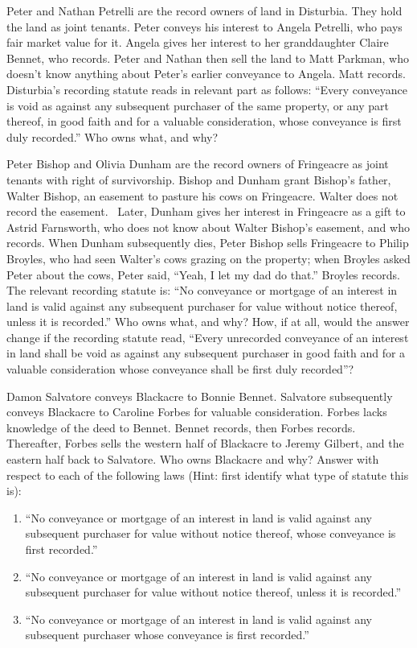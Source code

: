 \item Peter and Nathan Petrelli are the record owners of land in Disturbia. They
hold the land as joint tenants. Peter conveys his interest to Angela Petrelli,
who pays fair market value for it. Angela gives her interest to her
granddaughter Claire Bennet, who records. Peter and Nathan then sell the land
to Matt Parkman, who doesn't know anything about Peter's earlier conveyance to
Angela. Matt records. Disturbia's recording statute reads in relevant part as
follows: ``Every conveyance is void as against any subsequent purchaser of the
same property, or any part thereof, in good faith and for a valuable
consideration, whose conveyance is first duly recorded.'' Who owns what, and
why?


\item Peter Bishop and Olivia Dunham are the record owners of Fringeacre as
joint tenants with right of survivorship. Bishop and Dunham grant Bishop's
father, Walter Bishop, an easement to pasture his cows on Fringeacre. Walter
does not record the easement. ~Later, Dunham gives her interest in Fringeacre
as a gift to Astrid Farnsworth, who does not know about Walter Bishop's
easement, and who records. When Dunham subsequently dies, Peter Bishop sells
Fringeacre to Philip Broyles, who had seen Walter's cows grazing on the
property; when Broyles asked Peter about the cows, Peter said, ``Yeah, I let my
dad do that.'' Broyles records. The relevant recording statute is: ``No
conveyance or mortgage of an interest in land is valid against any subsequent
purchaser for value without notice thereof, unless it is recorded.'' Who owns
what, and why? How, if at all, would the answer change if the recording statute
read, ``Every unrecorded conveyance of an interest in land shall be void as
against any subsequent purchaser in good faith and for a valuable consideration
whose conveyance shall be first duly recorded''?


\item Damon Salvatore conveys Blackacre to Bonnie Bennet. Salvatore subsequently
conveys Blackacre to Caroline Forbes for valuable consideration. Forbes lacks
knowledge of the deed to Bennet. Bennet records, then Forbes records.
Thereafter, Forbes sells the western half of Blackacre to Jeremy Gilbert, and
the eastern half back to Salvatore. Who owns Blackacre and why? Answer with
respect to each of the following laws (Hint: first identify what type of
statute this is): 
\begin{enumerate}
\item {}``No conveyance or mortgage of an interest in land is valid against any
subsequent purchaser for value without notice thereof, whose conveyance is
first recorded.''
\item {}``No conveyance or mortgage of an interest in land is valid against any
subsequent purchaser for value without notice thereof, unless it is recorded.''
\item {}``No conveyance or mortgage of an interest in land is valid against any
subsequent purchaser whose conveyance is first recorded.''
\end{enumerate}


